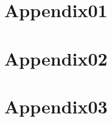 \begin{appendices}

\chapter{Appendix01}


\chapter{Appendix02}


\chapter{Appendix03}


\end{appendices}